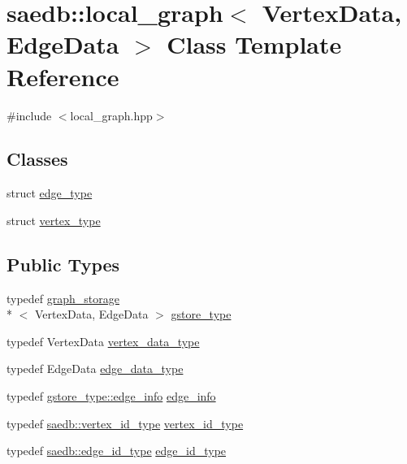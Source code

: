 \hypertarget{classsaedb_1_1local__graph}{\section{saedb\-:\-:local\-\_\-graph$<$ Vertex\-Data, Edge\-Data $>$ Class Template Reference}
\label{d9/d4a/classsaedb_1_1local__graph}
}


{\ttfamily \#include $<$local\-\_\-graph.\-hpp$>$}

\subsection*{Classes}
\begin{DoxyCompactItemize}
\item 
struct \hyperlink{structsaedb_1_1local__graph_1_1edge__type}{edge\-\_\-type}
\item 
struct \hyperlink{structsaedb_1_1local__graph_1_1vertex__type}{vertex\-\_\-type}
\end{DoxyCompactItemize}
\subsection*{Public Types}
\begin{DoxyCompactItemize}
\item 
typedef \hyperlink{classsaedb_1_1graph__storage}{graph\-\_\-storage}\\*
$<$ Vertex\-Data, Edge\-Data $>$ \hyperlink{classsaedb_1_1local__graph_ab143bc0748941696c01a5569bcd79151}{gstore\-\_\-type}
\item 
typedef Vertex\-Data \hyperlink{classsaedb_1_1local__graph_a844bd7c9e27012270a4d6499ff830360}{vertex\-\_\-data\-\_\-type}
\item 
typedef Edge\-Data \hyperlink{classsaedb_1_1local__graph_a40ea4338f0e7fcd205b83b41e3f86e8c}{edge\-\_\-data\-\_\-type}
\item 
typedef \hyperlink{classsaedb_1_1graph__storage_1_1edge__info}{gstore\-\_\-type\-::edge\-\_\-info} \hyperlink{classsaedb_1_1local__graph_a7aa24181f4937dcdc434987de7e92e44}{edge\-\_\-info}
\item 
typedef \hyperlink{namespacesaedb_a502e07e24003e811ae3bd73514c2798a}{saedb\-::vertex\-\_\-id\-\_\-type} \hyperlink{classsaedb_1_1local__graph_ad6685eb4027c1d0c86d6660ab382fe55}{vertex\-\_\-id\-\_\-type}
\item 
typedef \hyperlink{namespacesaedb_af76c9a21f199f95828dd18699754cad1}{saedb\-::edge\-\_\-id\-\_\-type} \hyperlink{classsaedb_1_1local__graph_a947191fe9f882212df867404c43d1c7a}{edge\-\_\-id\-\_\-type}
\end{DoxyCompactItemize}


